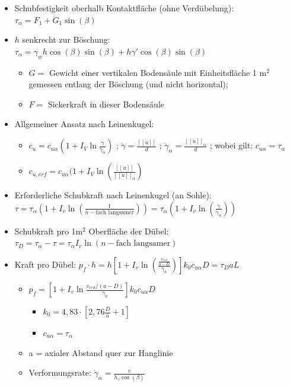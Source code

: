 \documentclass[fleqn,twoside]{article}
\begin{document}
\begin{itemize}
	\item Schubfestigkeit oberhalb Kontaktfläche (ohne Verdübelung): $\tau_\alpha = F_1 + G_1 \sin(\beta)$
	\item $h$ senkrecht zur Böschung: $\tau_\alpha = \gamma_w h \cos(\beta) \sin(\beta) + h \gamma' \cos(\beta) \sin(\beta)$
	\begin{itemize}
		\item $G =$ Gewicht einer vertikalen Bodensäule mit Einheitsfläche 1 m$^2$ gemessen entlang der Böschung (und nicht horizontal); 		
		\item $F =$ Sickerkraft in dieser Bodensäule
	\end{itemize}
	\item Allgemeiner Ansatz nach Leinenkugel:
	\begin{itemize}
	    \item $c_u = c_{u\alpha}\left(1+I_V\ln\frac{\dot{\gamma}}{\dot{\gamma}_\alpha}\right)$ ; $\dot{\gamma} = \frac{[[\dot{u}]]}{d}$ ; $\dot{\gamma}_\alpha = \frac{[[\dot{u}]]_\alpha}{d}$ ; wobei gilt: $c_{u\alpha}=\tau_\alpha$
	    \item $c_{u,erf} = c_{u\alpha}(1+I_V\ln\left(\frac{[[\dot{u}]]}{[[\dot{u}]]_\alpha}\right)$
	\end{itemize}
	\item Erforderliche Schubkraft nach Leinenkugel (an Sohle): $\tau = \tau_\alpha \left( 1+ I_v \ln \left( \frac{1}{n-\text{fach langsamer}} \right) \right) = \tau_{\alpha} \left( 1+I_v \ln\left(\frac{\dot{\gamma}}{\dot{\gamma_{\alpha}}}\right)\right)$
	\item Schubkraft pro 1m$^2$ Oberfläche der Dübel: $\tau_D = \tau_\alpha - \tau = \tau_\alpha I_v \ln (n-\text{fach langsamer})$
	\item Kraft pro Dübel: $p_f \cdot h= h \left[1+I_v \ln\left(\frac{\frac{v_{red}}{a-D}}{\dot{\gamma_a}}\right)\right] k_0 c_{u\alpha} D = \tau_D a L$ 
	\begin{itemize}
		\item $p_f = \left[1+I_v \ln \frac{v_{red} / (a-D)}{\dot{\gamma_a}}\right] k_0 c_{u\alpha} D$
		\begin{itemize}
			\item $k_0 = 4,83 \cdot \left[ 2,76 \frac{D}{a}+1 \right]$
			\item $c_{u\alpha}=\tau_\alpha$
		\end{itemize}
		\item a = axialer Abstand quer zur Hanglinie
		\item Verformungsrate: $\dot{\gamma}_\alpha = \frac{v}{h_\gamma \cos(\beta)}$
	\end{itemize}
		

\end{itemize}
\end{document}
